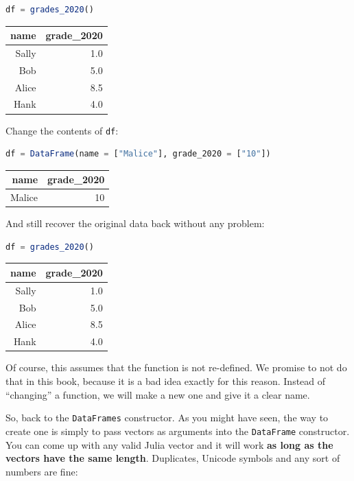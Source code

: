 \documentclass[
  notoc %
]{tufte-book}
\newcommand{\passthrough}[1]{#1}
\begin{document}
\begin{lstlisting}[language=Julia]
df = grades_2020()
\end{lstlisting}

\begin{longtable}[]{@{}rr@{}}
\toprule
name & grade\_2020 \\
\midrule
\endhead
Sally & 1.0 \\
Bob & 5.0 \\
Alice & 8.5 \\
Hank & 4.0 \\
\bottomrule
\end{longtable}

Change the contents of \passthrough{\lstinline!df!}:

\begin{lstlisting}[language=Julia]
df = DataFrame(name = ["Malice"], grade_2020 = ["10"])
\end{lstlisting}

\begin{longtable}[]{@{}rr@{}}
\toprule
name & grade\_2020 \\
\midrule
\endhead
Malice & 10 \\
\bottomrule
\end{longtable}

And still recover the original data back without any problem:

\begin{lstlisting}[language=Julia]
df = grades_2020()
\end{lstlisting}

\begin{longtable}[]{@{}rr@{}}
\toprule
name & grade\_2020 \\
\midrule
\endhead
Sally & 1.0 \\
Bob & 5.0 \\
Alice & 8.5 \\
Hank & 4.0 \\
\bottomrule
\end{longtable}

Of course, this assumes that the function is not re-defined. We promise
to not do that in this book, because it is a bad idea exactly for this
reason. Instead of ``changing'' a function, we will make a new one and
give it a clear name.

So, back to the \passthrough{\lstinline!DataFrames!} constructor. As you
might have seen, the way to create one is simply to pass vectors as
arguments into the \passthrough{\lstinline!DataFrame!} constructor. You
can come up with any valid Julia vector and it will work \textbf{as long
as the vectors have the same length}. Duplicates, Unicode symbols and
any sort of numbers are fine:
\end{document}
